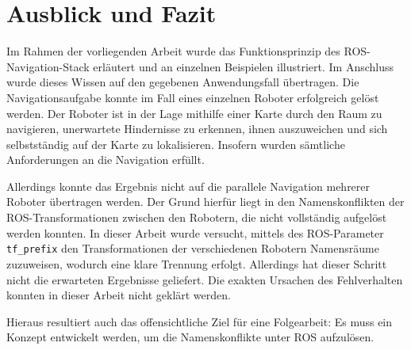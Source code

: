\chapter{Ausblick und Fazit}
Im Rahmen der vorliegenden Arbeit wurde das Funktionsprinzip des ROS-Navigation-Stack erläutert und an einzelnen Beispielen illustriert. Im Anschluss wurde dieses Wissen auf den gegebenen Anwendungsfall übertragen. Die Navigationsaufgabe konnte im Fall eines einzelnen Roboter erfolgreich gelöst werden. Der Roboter ist in der Lage mithilfe einer Karte durch den Raum zu navigieren, unerwartete Hindernisse zu erkennen, ihnen auszuweichen und sich selbstständig auf der Karte zu lokalisieren. Insofern wurden sämtliche Anforderungen an die Navigation erfüllt.

Allerdings konnte das Ergebnis nicht auf die parallele Navigation mehrerer Roboter übertragen werden. Der Grund hierfür liegt in den Namenskonflikten der ROS-Transformationen zwischen den Robotern, die nicht vollständig aufgelöst werden konnten. In dieser Arbeit wurde versucht, mittels des ROS-Parameter \lstinline{tf_prefix}{} den Transformationen der verschiedenen Robotern Namensräume zuzuweisen, wodurch eine klare Trennung erfolgt. Allerdings hat dieser Schritt nicht die erwarteten Ergebnisse geliefert. Die exakten Ursachen des Fehlverhalten konnten in dieser Arbeit nicht geklärt werden.

Hieraus resultiert auch das offensichtliche Ziel für eine Folgearbeit: Es muss ein Konzept entwickelt werden, um die Namenskonflikte unter ROS aufzulösen.